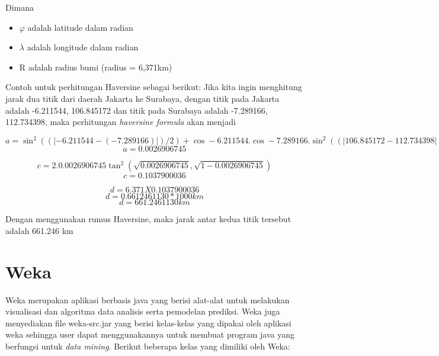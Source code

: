 Dimana 
\begin{itemize}
	\item $\varphi$ adalah latitude dalam radian
	\item $\lambda$ adalah longitude dalam radian
	\item R adalah radius bumi (radius = 6,371km)
\end{itemize}

Contoh untuk perhitungan Haversine sebagai berikut:
Jika kita ingin menghitung jarak dua titik dari daerah Jakarta ke Surabaya, dengan titik pada Jakarta adalah -6.211544, 106.845172 dan titik pada Surabaya adalah -7.289166, 112.734398, maka perhitungan \textsl{haversine formula} akan menjadi

\begin{displaymath}
	a = \sin^{2}((|-6.211544-(-7.289166)|)/2) + \cos-6.211544 . \cos-7.289166 . \sin^{2}((|106.845172-112.734398|)/2)
\end{displaymath}
\begin{displaymath}
	a = 0.0026906745
\end{displaymath}

\begin{displaymath}
	c = 2 . 0.0026906745\tan^{2}(\sqrt{0.0026906745}, \sqrt{1-0.0026906745})
\end{displaymath}
\begin{displaymath}
	c =  0.1037900036
\end{displaymath}

\begin{displaymath}
	d = 6.371 X 0.1037900036
\end{displaymath}
\begin{displaymath}
	d = 0.6612461130 * 1000 km
\end{displaymath}
\begin{displaymath}
	d = 661.2461130 km
\end{displaymath}

Dengan menggunakan rumus Haversine, maka jarak antar kedua titik tersebut adalah 661.246 km

\section{Weka}\cite{Weka}
Weka merupakan aplikasi berbasis java yang berisi alat-alat untuk melakukan visualisasi dan algoritma data analisis serta pemodelan prediksi. Weka juga menyediakan file weka-src.jar yang berisi kelas-kelas yang dipakai oleh aplikasi weka sehingga user dapat menggunakannya untuk membuat program java yang berfungsi untuk \textsl{data mining}. Berikut beberapa kelas yang dimiliki oleh Weka:

